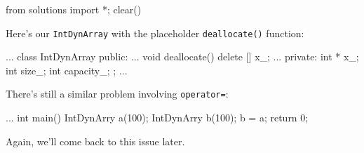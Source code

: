 \begin{python0}
from solutions import *; clear()
\end{python0}

Here's our \texttt{IntDynArray} with the placeholder
\texttt{deallocate()} function:

\begin{consolethree}[escapeinside=||]
...
class IntDynArray
{
public:
    ...
    void deallocate()
    {
        delete [] x_;
    }
    ...
private:
    int * x_;
    int size_;
    int capacity_;
};
...
\end{consolethree}


There's still a similar problem involving
\texttt{operator=}:

\begin{consolethree}[escapeinside=||]
...
int main()
{
    IntDynArry a(100);
    IntDynArry b(100);
    b = a;
    return 0;
}
\end{consolethree}

Again, we'll come back to this issue later.


